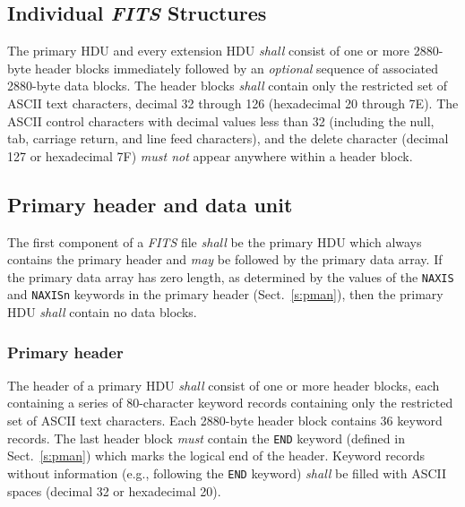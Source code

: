 \documentclass[onecolumn]{aa}
\begin{document}
  \subsection {Individual {\em FITS\/} Structures} 
   The primary HDU and every
   extension  HDU {\em shall} consist
   of one or more 2880-byte header blocks immediately followed by an {\em optional}
   sequence of associated 2880-byte data blocks. The header blocks {\em shall}
   contain only the restricted set of ASCII text characters,
   decimal 32 through 126 (hexadecimal 20 through 7E).  The ASCII control
   characters with decimal values less than 32 (including the null, tab,
   carriage return, and line feed characters), and the delete character
   (decimal 127 or hexadecimal 7F) {\em must not} appear anywhere within a header block.  

  \subsection{Primary header and data unit}
   The first component of a {\em FITS\/} file {\em shall} be the 
   primary HDU which always contains the primary header and 
   {\em may} be followed by
   the primary data
   array. If the primary data array has zero length, as
   determined by the values of the {\tt NAXIS} 
   and {\tt NAXISn} keywords
   in the primary header (Sect.\ \ref{s:pman}), then the primary HDU
   {\em shall} contain no data blocks.
  
   \subsubsection{Primary header} The header of a primary 
   HDU {\em shall} consist of  one or more header blocks, each
   containing a series of 80-character keyword 
   records containing only the restricted set of 
   ASCII
   text characters.  Each 2880-byte header  block contains 36 keyword
   records.  The last header block {\em must} contain the {\tt END} keyword
   (defined in Sect.\ \ref{s:pman}) which marks the logical end of the header. 
   Keyword records without information  (e.g., following the
   {\tt END}  keyword) {\em shall} be
   filled with ASCII spaces (decimal 32 or hexadecimal 20).
\end{document}
